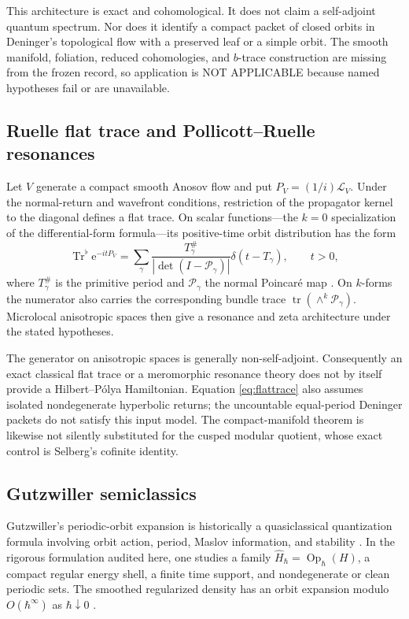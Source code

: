 \documentclass[11pt]{article}
\theoremstyle{definition}
\theoremstyle{remark}
\newcommand{\Tr}{\operatorname{Tr}}
\newcommand{\e}{\mathrm{e}}
\newcommand{\notapp}{\textsf{NOT APPLICABLE}\xspace}
\begin{document}
This architecture is exact and cohomological.  It does not claim a
self-adjoint quantum spectrum.  Nor does it identify a compact packet of
closed orbits in Deninger's topological flow with a preserved leaf or a simple
orbit.  The smooth manifold, foliation, reduced cohomologies, and \(b\)-trace
construction are missing from the frozen record, so application is
\notapp{} because named hypotheses fail or are unavailable.

\subsection{Ruelle flat trace and Pollicott--Ruelle resonances}

Let \(V\) generate a compact smooth Anosov flow and put
\(P_V=(1/i)\mathcal L_V\).  Under the normal-return and wavefront conditions,
restriction of the propagator kernel to the diagonal defines a flat trace.
On scalar functions---the \(k=0\) specialization of the differential-form
formula---its positive-time orbit distribution has the form
\begin{equation}
 \Tr^{\flat}\e^{-itP_V}
 =\sum_{\gamma}
   \frac{T_\gamma^\#}{|\det(I-\mathcal P_\gamma)|}
   \delta(t-T_\gamma),\qquad t>0,
 \label{eq:flattrace}
\end{equation}
where \(T_\gamma^\#\) is the primitive period and \(\mathcal P_\gamma\) the
normal Poincar\'e map \citep{DyatlovZworski2016}.  On \(k\)-forms the numerator
also carries the corresponding bundle trace
\(\operatorname{tr}(\wedge^k\mathcal P_\gamma)\).  Microlocal anisotropic
spaces then give a resonance and zeta architecture under the stated
hypotheses.

The generator on anisotropic spaces is generally non-self-adjoint.
Consequently an exact classical flat trace or a meromorphic resonance theory
does not by itself provide a Hilbert--P\'olya Hamiltonian.  Equation
\eqref{eq:flattrace} also assumes isolated nondegenerate hyperbolic returns;
the uncountable equal-period Deninger packets do not satisfy this input model.
The compact-manifold theorem is likewise not silently substituted for the
cusped modular quotient, whose exact control is Selberg's cofinite identity.

\subsection{Gutzwiller semiclassics}

Gutzwiller's periodic-orbit expansion is historically a quasiclassical
quantization formula involving orbit action, period, Maslov information, and
stability \citep{Gutzwiller1971}.  In the rigorous formulation audited here,
one studies a family
\(\widehat H_\hbar=\operatorname{Op}_\hbar(H)\), a compact regular energy
shell, a finite time support, and nondegenerate or clean periodic sets.  The
smoothed regularized density has an orbit expansion modulo
\(O(\hbar^\infty)\) as \(\hbar\downarrow0\)
\citep{CombescureRalstonRobert1999}.
\end{document}
